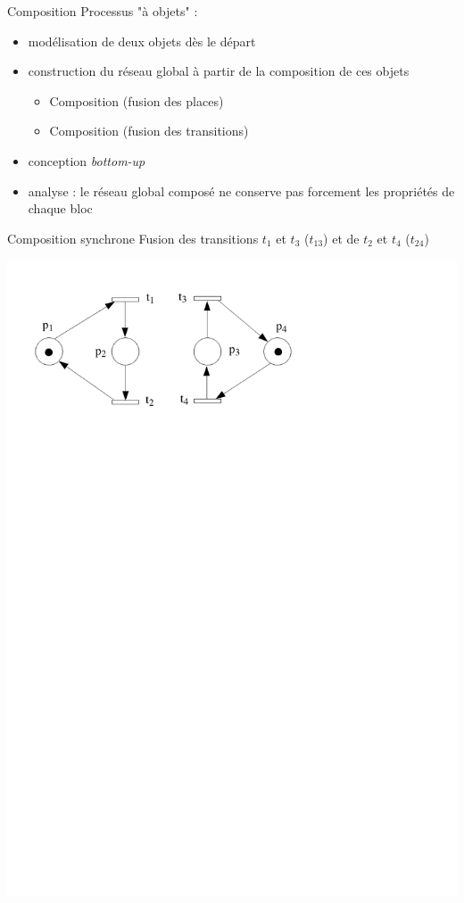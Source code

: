 \documentclass[compress]{beamer}
\begin{document}
\begin{frame}{Composition}
Processus "à objets" :
\begin{itemize}
\item modélisation  de deux objets dès le départ
\item construction du réseau global à partir de la composition de ces objets
	\begin{itemize}
	\item Composition  (fusion des places)
	\item Composition  (fusion des transitions)
	\end{itemize}
\item conception {\it bottom-up}
\item analyse : le réseau global composé ne conserve pas forcement les propriétés de chaque bloc
\end{itemize}
\end{frame}
  
\begin{frame}{Composition synchrone}
Fusion des transitions $t_1$ et $t_3$ ($t_{13}$) et de $t_2$ et $t_4$ ($t_{24}$)
\begin{center}
\includegraphics[width=.8\linewidth]{compoa}
\end{center}
\end{frame}
\end{document}
